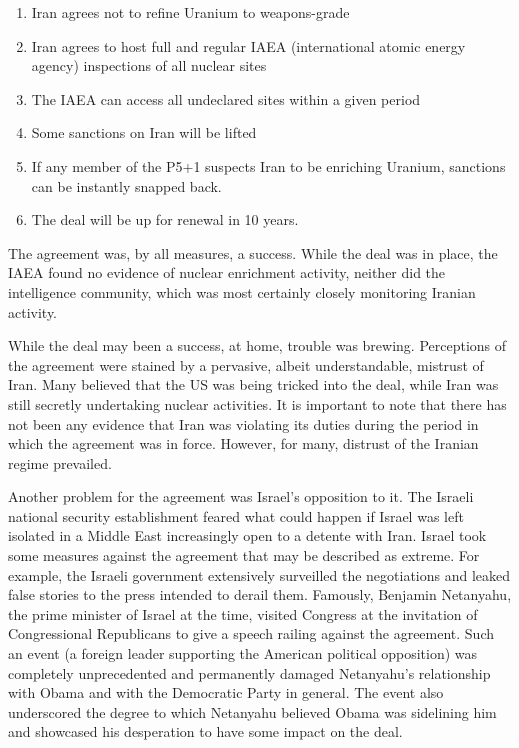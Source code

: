 \begin{enumerate}
	\item Iran agrees not to refine Uranium to weapons-grade
	\item Iran agrees to host full and regular IAEA (international atomic energy
		agency) inspections of all nuclear sites
	\item The IAEA can access all undeclared sites within a given period
	\item Some sanctions on Iran will be lifted
	\item If any member of the P5+1 suspects Iran to be enriching Uranium,
		sanctions can be instantly snapped back.
	\item The deal will be up for renewal in 10 years.
\end{enumerate}

The agreement was, by all measures, a success\parencite{crs}. While the deal was
in place, the IAEA found no evidence of nuclear enrichment activity, neither did
the intelligence community, which was most certainly closely monitoring Iranian
activity.

While the deal may been a success, at home, trouble was brewing. Perceptions of
the agreement were stained by a pervasive, albeit understandable, mistrust of
Iran. Many believed that the US was being tricked into the deal, while Iran was
still secretly undertaking nuclear activities. It is important to note that there
has not been any evidence that Iran was violating its duties during the period
in which the agreement was in force. However, for many, distrust of the Iranian
regime prevailed.

Another problem for the agreement was Israel's opposition to it. The Israeli
national security establishment feared what could happen if Israel was left
isolated in a Middle East increasingly open to a detente with Iran. Israel took
some measures against the agreement that may be described as extreme. For
example, the Israeli government extensively surveilled the negotiations and
leaked false stories to the press intended to derail them. Famously, Benjamin
Netanyahu, the prime minister of Israel at the time, visited Congress at the
invitation of Congressional Republicans to give a speech railing against the
agreement. Such an event (a foreign leader supporting the American political
opposition) was completely unprecedented and permanently damaged Netanyahu's
relationship with Obama and with the Democratic Party in general. The event also
underscored the degree to which Netanyahu believed Obama was sidelining him and
showcased his desperation to have some impact on the deal.

